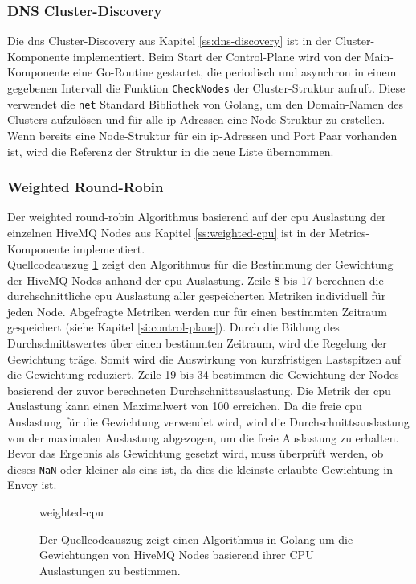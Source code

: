 \subsubsection{DNS Cluster-Discovery}
Die \ac{dns} Cluster-Discovery aus Kapitel \ref{ss:dns-discovery} ist in der Cluster-Komponente implementiert.
Beim Start der Control-Plane wird von der Main-Komponente eine Go-Routine gestartet, die periodisch und asynchron in einem gegebenen Intervall die Funktion \verb|CheckNodes| der Cluster-Struktur aufruft.
Diese verwendet die \verb|net| Standard Bibliothek von Golang, um den Domain-Namen des Clusters aufzulösen und für alle \ac{ip}-Adressen eine Node-Struktur zu erstellen.
Wenn bereits eine Node-Struktur für ein \ac{ip}-Adressen und Port Paar vorhanden ist, wird die Referenz der Struktur in die neue Liste übernommen.

\subsubsection{Weighted Round-Robin}
Der weighted round-robin Algorithmus basierend auf der \ac{cpu} Auslastung der einzelnen HiveMQ Nodes aus Kapitel \ref{ss:weighted-cpu} ist in der Metrics-Komponente implementiert.
\\
Quellcodeauszug \ref{code:weighted-cpu} zeigt den Algorithmus für die Bestimmung der Gewichtung der HiveMQ Nodes anhand der \ac{cpu} Auslastung.
Zeile 8 bis 17 berechnen die durchschnittliche \ac{cpu} Auslastung aller gespeicherten Metriken individuell für jeden Node. Abgefragte Metriken werden nur für einen bestimmten Zeitraum gespeichert (siehe Kapitel \ref{si:control-plane}). Durch die Bildung des Durchschnittswertes über einen bestimmten Zeitraum, wird die Regelung der Gewichtung träge. Somit wird die Auswirkung von kurzfristigen Lastspitzen auf die Gewichtung reduziert.
Zeile 19 bis 34 bestimmen die Gewichtung der Nodes basierend der zuvor berechneten Durchschnittsauslastung. Die Metrik der \ac{cpu} Auslastung kann einen Maximalwert von 100 erreichen. Da die freie \ac{cpu} Auslastung für die Gewichtung verwendet wird, wird die Durchschnittsauslastung von der maximalen Auslastung abgezogen, um die freie Auslastung zu erhalten. Bevor das Ergebnis als Gewichtung gesetzt wird, muss überprüft werden, ob dieses \verb|NaN| oder kleiner als eins ist, da dies die kleinste erlaubte Gewichtung in Envoy ist.
\begin{figure}
    {weighted-cpu}
    \caption{Der Quellcodeauszug zeigt einen Algorithmus in Golang um die Gewichtungen von HiveMQ Nodes basierend ihrer CPU Auslastungen zu bestimmen.}
    \label{code:weighted-cpu}
\end{figure}

